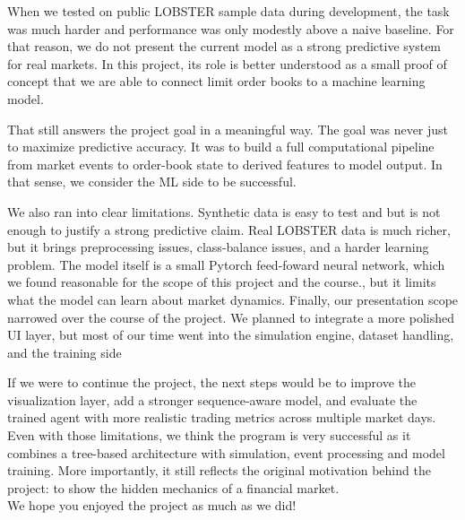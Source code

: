 \documentclass[11pt]{article}
\begin{document}
When we tested on public LOBSTER sample data during development, the task was
much harder and performance was only modestly above a naive baseline. For that
reason, we do not present the current model as a strong predictive system for
real markets. In this project, its role is better understood as a small
proof of concept that we are able to connect limit order books to a machine learning model.

That still answers the project goal in a meaningful way. The goal was never
just to maximize predictive accuracy. It was to build a full computational
pipeline from market events to order-book state to derived features to model
output. In that sense, we consider the ML side to be successful.

We also ran into clear limitations. Synthetic data is easy to test and but is not enough to justify a strong predictive claim. Real LOBSTER
data is much richer, but it brings preprocessing issues, class-balance issues,
and a harder learning problem. The model itself is a small Pytorch feed-foward neural network, which we found reasonable for the scope of this project and the course., but it limits what the model can
learn about market dynamics. Finally, our presentation scope narrowed over the
course of the project. We planned to integrate a more polished UI layer, but most
of our time went into the simulation engine, dataset handling, and the training side

If we were to continue the project, the next steps would be to improve the
visualization layer, add a stronger sequence-aware model, and evaluate the
trained agent with more realistic trading metrics across multiple market days.
Even with those limitations, we think the program is very successful as it combines a tree-based architecture with simulation, event processing and model training.
More importantly, it still reflects the original motivation behind the project:
to show the hidden mechanics of a financial market. \\

We hope you enjoyed the project as much as we did!
\end{document}
